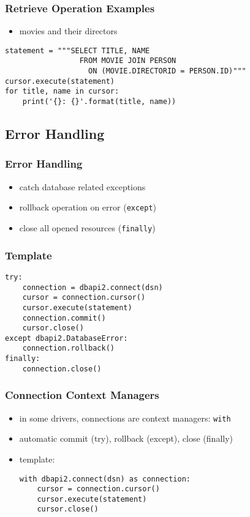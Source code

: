 \documentclass[dvipsnames]{beamer}
\theoremstyle{plain}
\begin{document}
\begin{frame}[fragile]
  \frametitle{Retrieve Operation Examples}

  \begin{itemize}
    \item movies and their directors
  \end{itemize}

  \begin{lstlisting}
statement = """SELECT TITLE, NAME
                 FROM MOVIE JOIN PERSON
                   ON (MOVIE.DIRECTORID = PERSON.ID)"""
cursor.execute(statement)
for title, name in cursor:
    print('{}: {}'.format(title, name))
  \end{lstlisting}
\end{frame}

\subsection{Error Handling}

\begin{frame}
  \frametitle{Error Handling}

  \begin{itemize}
    \item catch database related exceptions

    \medskip
    \item rollback operation on error (\lstinline!except!)
    \item close all opened resources (\lstinline!finally!)
  \end{itemize}
\end{frame}

\begin{frame}[fragile]
  \frametitle{Template}

  \begin{lstlisting}
try:
    connection = dbapi2.connect(dsn)
    cursor = connection.cursor()
    cursor.execute(statement)
    connection.commit()
    cursor.close()
except dbapi2.DatabaseError:
    connection.rollback()
finally:
    connection.close()
  \end{lstlisting}
\end{frame}

\begin{frame}[fragile]
  \frametitle{Connection Context Managers}

  \begin{itemize}
    \item in some drivers, connections are context managers: \lstinline!with!
    \item automatic commit (try), rollback (except), close (finally)

    \medskip
    \item template:
    \begin{lstlisting}
with dbapi2.connect(dsn) as connection:
    cursor = connection.cursor()
    cursor.execute(statement)
    cursor.close()
    \end{lstlisting}
  \end{itemize}
\end{frame}
\end{document}
